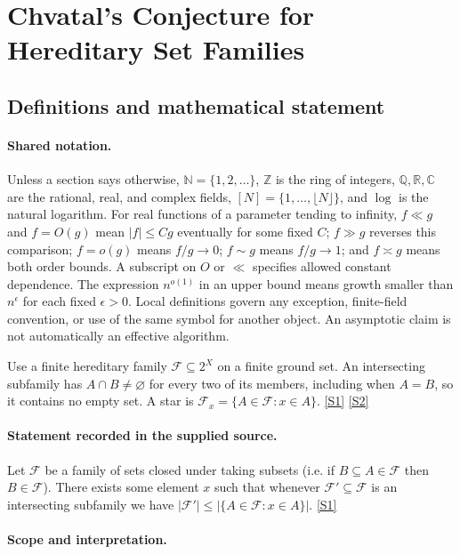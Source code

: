 \documentclass[11pt,a4paper]{article}
\newcommand{\N}{\mathbb{N}}
\newcommand{\Z}{\mathbb{Z}}
\newcommand{\Q}{\mathbb{Q}}
\newcommand{\R}{\mathbb{R}}
\newcommand{\C}{\mathbb{C}}
\newcommand{\sref}[2]{\hyperlink{source:#1:#2}{[S#2]}}
\begin{document}
\section{Chvatal's Conjecture for Hereditary Set Families}\label{statement}


\subsection{Definitions and mathematical statement}

\paragraph{Shared notation.}Unless a section says otherwise, $\N=\{1,2,\ldots\}$,
$\Z$ is the ring of integers, $\Q,\R,\C$ are the rational, real, and complex
fields, $[N]=\{1,\ldots,\lfloor N\rfloor\}$, and $\log$ is the natural
logarithm. For real functions of a parameter tending to infinity,
$f\ll g$ and $f=O(g)$ mean $|f|\leq Cg$ eventually for some fixed $C$;
$f\gg g$ reverses this comparison; $f=o(g)$ means $f/g\to0$;
$f\sim g$ means $f/g\to1$; and $f\asymp g$ means both order bounds.
A subscript on $O$ or $\ll$ specifies allowed constant dependence.
The expression $n^{o(1)}$ in an upper bound means growth smaller than
$n^\epsilon$ for each fixed $\epsilon>0$. Local definitions govern any
exception, finite-field convention, or use of the same symbol for another
object. An asymptotic claim is not automatically an effective algorithm.



Use a finite hereditary family $\mathcal F\subseteq2^X$ on a finite ground set. An intersecting subfamily has $A\cap B\ne\varnothing$ for every two of its members, including when $A=B$, so it contains no empty set. A star is $\mathcal F_x=\{A\in\mathcal F:x\in A\}$. \sref{statement}{1} \sref{statement}{2}

\paragraph{Statement recorded in the supplied source.}
Let $\mathcal{F}$ be a family of sets closed under taking subsets (i.e. if $B\subseteq A\in\mathcal{F}$ then $B\in \mathcal{F}$). There exists some element $x$ such that whenever $\mathcal{F}'\subseteq \mathcal{F}$ is an intersecting subfamily we have $ \lvert \mathcal{F}'\rvert \leq \lvert \{ A\in \mathcal{F} : x\in A\}\rvert. $ \sref{statement}{1}

\paragraph{Scope and interpretation.}
\end{document}

